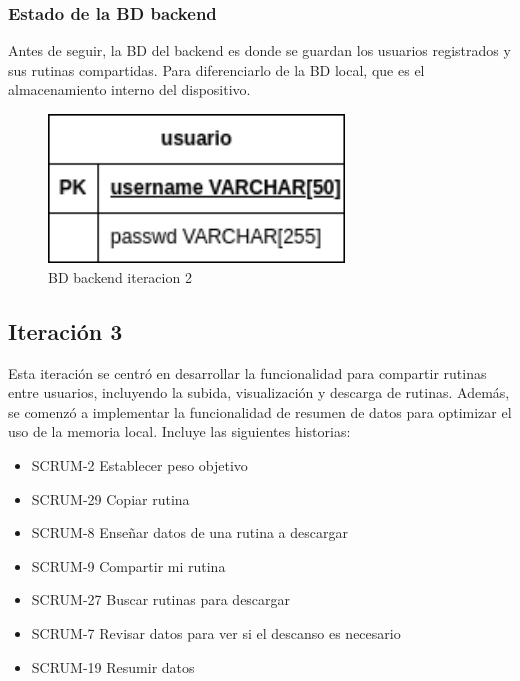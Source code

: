 \subsubsection{Estado de la BD backend} 

Antes de seguir, la BD del backend es donde se guardan los usuarios registrados y sus rutinas compartidas. Para diferenciarlo de la BD local, que es el almacenamiento interno del dispositivo.

\begin{figure}[H]
   \centering
    \includegraphics[width=0.7\textwidth]{fotos/BD be iteracion 2.png}
    \caption{BD backend iteracion 2}
    \label{fig:BD backend iteracion 2}
\end{figure}

\subsection{Iteración 3}
Esta iteración se centró en desarrollar la funcionalidad para compartir rutinas entre usuarios, incluyendo la subida, visualización y descarga de rutinas. Además, se comenzó a implementar la funcionalidad de resumen de datos para optimizar el uso de la memoria local. Incluye las siguientes historias:

\begin{itemize}
  \item SCRUM-2 Establecer peso objetivo
  \item SCRUM-29 Copiar rutina
  \item SCRUM-8 Enseñar datos de una rutina a descargar
  \item SCRUM-9 Compartir mi rutina
  \item SCRUM-27 Buscar rutinas para descargar
  \item SCRUM-7 Revisar datos para ver si el descanso es necesario
  \item SCRUM-19 Resumir datos
\end{itemize}



